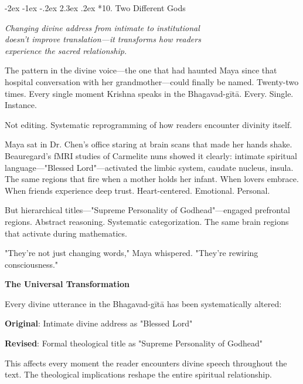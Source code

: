 \documentclass[12pt,twoside]{book}
\makeatletter
\renewcommand\section{\@startsection{section}{1}{\z@}%
{-2ex \@plus -1ex \@minus -.2ex}%
{2.3ex \@plus.2ex}%
{\normalfont\Large\bfseries}}
\makeatother
\begin{document}
\section*{10. Two Different Gods}
\thispagestyle{chapterpage}

{\centering\itshape Changing divine address from intimate to institutional\\doesn't improve translation—it transforms how readers\\experience the sacred relationship.\par}
\vspace{0.3cm}

\normalfont\justifying
The pattern in the divine voice—the one that had haunted Maya since that hospital conversation with her grandmother—could finally be named. Twenty-two times. Every single moment Krishna speaks in the Bhagavad-gītā. Every. Single. Instance.

Not editing. Systematic reprogramming of how readers encounter divinity itself.

Maya sat in Dr. Chen's office staring at brain scans that made her hands shake. Beauregard's fMRI studies of Carmelite nuns showed it clearly: intimate spiritual language—"Blessed Lord"—activated the limbic system, caudate nucleus, insula. The same regions that fire when a mother holds her infant. When lovers embrace. When friends experience deep trust. Heart-centered. Emotional. Personal.

But hierarchical titles—"Supreme Personality of Godhead"—engaged prefrontal regions. Abstract reasoning. Systematic categorization. The same brain regions that activate during mathematics.

"They're not just changing words," Maya whispered. "They're rewiring consciousness."

\vspace{-0.5cm}

\vspace{0.5cm}
\textbf{The Universal Transformation}
\vspace{0.2cm}


Every divine utterance in the Bhagavad-gītā has been systematically altered:

\textbf{\textbf{Original}}: Intimate divine address as "Blessed Lord"

\textbf{\textbf{Revised}}: Formal theological title as "Supreme Personality of Godhead"

This affects every moment the reader encounters divine speech throughout the text. The theological implications reshape the entire spiritual relationship.
\end{document}
